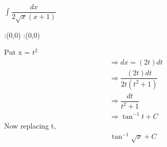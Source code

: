 



\question[5] $\int \dfrac{dx}{2\sqrt{x}(x+1)}$ 


\watchout

\ifprintanswers
  \begin{marginfigure}
      :(0,0)
      :(0,0)
    \figdrawbegin{}
      \figdrawline [100,101]
    \figdrawend
    \figvisu{\figBoxA}{}{%
    }
    \centerline{\box\figBoxA}
  \end{marginfigure}
\fi 

\begin{solution}[\halfpage]
Put x = $t^2$\\
\begin{align}
&\Rightarrow dx = (2t) dt  \\
&\Rightarrow \dfrac{(2t) dt}{2t(t^2+1)}\\
&\Rightarrow \dfrac{dt}{t^2+1}\\
&\Rightarrow \tan ^ {-1} t + C 
\end{align}
Now replacing t,\\
\begin{align}
\tan ^ {-1} \sqrt{x} +C
\end{align}
\end{solution}


